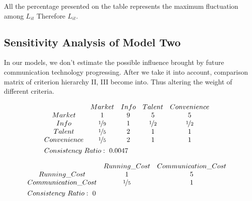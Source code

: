 \documentclass{mcmthesis}
\begin{document}
All the percentage presented on the table represents the maximum fluctuation among $L_{it}$ Therefore $L_{it}$.

\subsection{Sensitivity Analysis of Model Two}
In our models, we don't estimate the possible influence brought by future communication technology progressing. After we take it into account, comparison matrix of criterion hierarchy II, III become into. Thus altering the weight of different criteria.

\begin{align*}
    &\begin{matrix}
    &Market&Info&Talent&Convenience\\
    Market&1&9&5&5\\
    Info&\nicefrac{1}{9}&1&\nicefrac{1}{2}&\nicefrac{1}{2}\\
    Talent&\nicefrac{1}{5}&2&1&1\\
    Convenience&\nicefrac{1}{5}&2&1&1
\end{matrix}\\
    &Consistency\ Ratio:\ 0.0047
\end{align*}

\begin{align*}
    &\begin{matrix}
    &Running\_Cost&Communication\_Cost\\
    Running\_Cost&1&5\\
    Communication\_Cost&\nicefrac{1}{5}&1
\end{matrix}\\
    &Consistency\ Ratio:\ 0
\end{align*}
\end{document}
